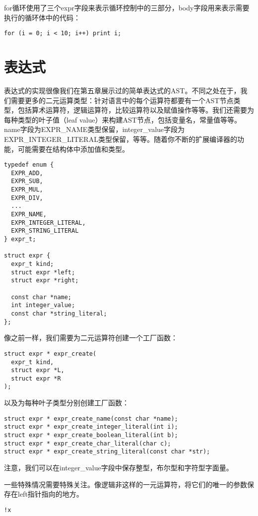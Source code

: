 \documentclass[cn,11pt,chinese]{elegantbook}
\begin{document}
for循环使用了三个expr字段来表示循环控制中的三部分，body字段用来表示需要执行的循环体中的代码：

\begin{verbatim}
for (i = 0; i < 10; i++) print i;
\end{verbatim}

\section{表达式}

表达式的实现很像我们在第五章展示过的简单表达式的AST。不同之处在于，我们需要更多的二元运算类型：针对语言中的每个运算符都要有一个AST节点类型，包括算术运算符，逻辑运算符，比较运算符以及赋值操作等等。我们还需要为每种类型的叶子值（leaf value）来构建AST节点，包括变量名，常量值等等。name字段为EXPR\_NAME类型保留，integer\_value字段为EXPR\_INTEGER\_LITERAL类型保留，等等。随着你不断的扩展编译器的功能，可能需要在结构体中添加值和类型。

\begin{verbatim}
typedef enum {
  EXPR_ADD,
  EXPR_SUB,
  EXPR_MUL,
  EXPR_DIV,
  ...
  EXPR_NAME,
  EXPR_INTEGER_LITERAL,
  EXPR_STRING_LITERAL
} expr_t;

struct expr {
  expr_t kind;
  struct expr *left;
  struct expr *right;
  
  const char *name;
  int integer_value;
  const char *string_literal;
};
\end{verbatim}

像之前一样，我们需要为二元运算符创建一个工厂函数：

\begin{verbatim}
struct expr * expr_create(
  expr_t kind,
  struct expr *L,
  struct expr *R
);
\end{verbatim}

以及为每种叶子类型分别创建工厂函数：

\begin{verbatim}
struct expr * expr_create_name(const char *name);
struct expr * expr_create_integer_literal(int i);
struct expr * expr_create_boolean_literal(int b);
struct expr * expr_create_char_literal(char c);
struct expr * expr_create_string_literal(const char *str);
\end{verbatim}

注意，我们可以在integer\_value字段中保存整型，布尔型和字符型字面量。

一些特殊情况需要特殊关注。像逻辑非这样的一元运算符，将它们的唯一的参数保存在left指针指向的地方。

\begin{verbatim}
!x
\end{verbatim}
\end{document}
